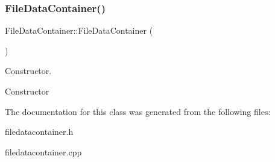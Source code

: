 \subsubsection{\texorpdfstring{FileDataContainer()}{FileDataContainer()}}
{\footnotesize\ttfamily File\+Data\+Container\+::\+File\+Data\+Container (\begin{DoxyParamCaption}{ }\end{DoxyParamCaption})}



Constructor. 

Constructor 

The documentation for this class was generated from the following files\+:\begin{DoxyCompactItemize}
\item 
filedatacontainer.\+h\item 
filedatacontainer.\+cpp\end{DoxyCompactItemize}
